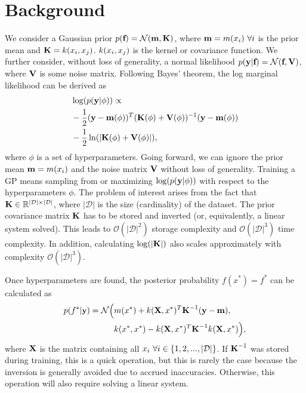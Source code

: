 \documentclass{article}
\renewcommand{\mathbf}[1]{%
  \ifx#1x x\else \textbf{#1}\fi
}
\begin{document}
\section{Background}
We consider a Gaussian prior $p(\mathbf{f})=\mathcal{N}(\mathbf{m}, \mathbf{K})$, where $\mathbf{m}=m(\mathbf{x}_i)~\forall i$ is the prior mean and $\mathbf{K}=k(\mathbf{x}_i, \mathbf{x}_j)$. $k(\mathbf{x}_i, \mathbf{x}_j)$ is the kernel or covariance function. We further consider, without loss of generality, a normal likelihood $p(\mathbf{y}|\mathbf{f})=\mathcal{N}(\mathbf{f}, \mathbf{V})$, where $\mathbf{V}$ is some noise matrix. 
Following Bayes' theorem, the log marginal likelihood can be derived as
\begin{align}
    &\log(p(\mathbf{y} | \phi)) \propto \nonumber \\ 
    & -\frac{1}{2} (\mathbf{y}-\mathbf{m}(\phi))^T (\mathbf{K}(\phi)+\mathbf{V}(\phi))^{-1} (\mathbf{y}-\mathbf{m}(\phi)) \nonumber \\
    & - \frac{1}{2} \ln(|\mathbf{K}(\phi)+\mathbf{V}(\phi)|) ,
\end{align}
where $\phi$ is a set of hyperparameters. Going forward, we can ignore the prior mean $\mathbf{m}=m(\mathbf{x}_i)$ and the noise matrix $\mathbf{V}$ without loss of generality. Training a GP means sampling from or maximizing $\log(p(\mathbf{y} | \phi))$ with respect to the hyperparameters $\phi$. The problem of interest arises from the fact that $\mathbf{K} \in \mathbb{R}^{|\mathcal{D}| \times |\mathcal{D}|}$, where $|\mathcal{D}|$ is the size (cardinality) of the dataset. The prior covariance matrix $\mathbf{K}$ has to be stored and inverted (or, equivalently, a linear system solved). This leads to $\mathcal{O}(|\mathcal{D}|^2)$ storage complexity and $\mathcal{O}(|\mathcal{D}|^3)$ time complexity. In addition, calculating $\log(|\mathbf{K}|)$ also scales approximately with complexity $\mathcal{O}(|\mathcal{D}|^3)$.

Once hyperparameters are found, the posterior probability $f(x^*) = f^*$ can be calculated as
\begin{align}\label{eq:posterior}
\small
p(f^*|\mathbf{y})=\mathcal{N}\Big(&m(\mathbf{x}^*) + k(\mathbf{X},\mathbf{x}^*)^T \mathbf{K}^{-1}  (\mathbf{y}-\mathbf{m}),~ \nonumber \\ 
& k(\mathbf{x}^*,\mathbf{x}^*) - k(\mathbf{X},\mathbf{x}^*)^T \mathbf{K}^{-1} k(\mathbf{X},\mathbf{x}^*)\Big), 
\end{align}
where $\mathbf{X}$ is the matrix containing all $\mathbf{x}_i~\forall i \in \{1,2,...,|\mathcal{D}|\}$. If $\mathbf{K}^{-1}$ was stored during training, this is a quick operation, but this is rarely the case because the inversion is generally avoided due to accrued inaccuracies. Otherwise, this operation will also require solving a linear system. 
\end{document}
